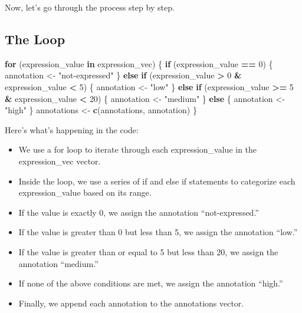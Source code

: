 \documentclass[
]{book}
\newenvironment{Shaded}{\begin{snugshade}}{\end{snugshade}}
\newcommand{\ControlFlowTok}[1]{\textcolor[rgb]{0.13,0.29,0.53}{\textbf{#1}}}
\newcommand{\DecValTok}[1]{\textcolor[rgb]{0.00,0.00,0.81}{#1}}
\newcommand{\FunctionTok}[1]{\textcolor[rgb]{0.13,0.29,0.53}{\textbf{#1}}}
\newcommand{\NormalTok}[1]{#1}
\newcommand{\OtherTok}[1]{\textcolor[rgb]{0.56,0.35,0.01}{#1}}
\newcommand{\SpecialCharTok}[1]{\textcolor[rgb]{0.81,0.36,0.00}{\textbf{#1}}}
\newcommand{\StringTok}[1]{\textcolor[rgb]{0.31,0.60,0.02}{#1}}
\begin{document}
Now, let's go through the process step by step.

\hypertarget{the-loop}{%
\subsection{The Loop}\label{the-loop}}

\begin{Shaded}
\begin{Highlighting}[]
\ControlFlowTok{for}\NormalTok{ (expression\_value }\ControlFlowTok{in}\NormalTok{ expression\_vec) \{}
  \ControlFlowTok{if}\NormalTok{ (expression\_value }\SpecialCharTok{==} \DecValTok{0}\NormalTok{) \{}
\NormalTok{    annotation }\OtherTok{\textless{}{-}} \StringTok{"not{-}expressed"} 
\NormalTok{  \} }\ControlFlowTok{else} \ControlFlowTok{if}\NormalTok{ (expression\_value }\SpecialCharTok{\textgreater{}} \DecValTok{0} \SpecialCharTok{\&}\NormalTok{ expression\_value }\SpecialCharTok{\textless{}} \DecValTok{5}\NormalTok{) \{}
\NormalTok{    annotation }\OtherTok{\textless{}{-}} \StringTok{"low"}
\NormalTok{  \} }\ControlFlowTok{else} \ControlFlowTok{if}\NormalTok{ (expression\_value }\SpecialCharTok{\textgreater{}=} \DecValTok{5} \SpecialCharTok{\&}\NormalTok{ expression\_value }\SpecialCharTok{\textless{}} \DecValTok{20}\NormalTok{) \{}
\NormalTok{    annotation }\OtherTok{\textless{}{-}} \StringTok{"medium"}
\NormalTok{  \} }\ControlFlowTok{else}\NormalTok{ \{}
\NormalTok{    annotation }\OtherTok{\textless{}{-}} \StringTok{"high"}
\NormalTok{  \}}
\NormalTok{  annotations }\OtherTok{\textless{}{-}} \FunctionTok{c}\NormalTok{(annotations, annotation)}
\NormalTok{\}}
\end{Highlighting}
\end{Shaded}

Here's what's happening in the code:

\begin{itemize}
\item
  We use a for loop to iterate through each expression\_value in the expression\_vec vector.
\item
  Inside the loop, we use a series of if and else if statements to categorize each expression\_value based on its range.
\item
  If the value is exactly 0, we assign the annotation ``not-expressed.''
\item
  If the value is greater than 0 but less than 5, we assign the annotation ``low.''
\item
  If the value is greater than or equal to 5 but less than 20, we assign the annotation ``medium.''
\item
  If none of the above conditions are met, we assign the annotation ``high.''
\item
  Finally, we append each annotation to the annotations vector.
\end{itemize}
\end{document}
